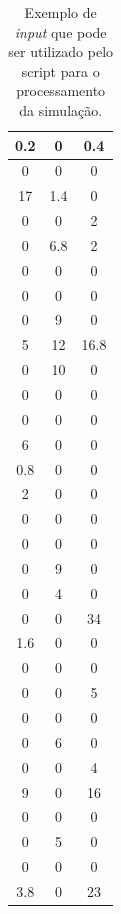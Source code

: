 \begin{table}[H]
\caption{Exemplo de \emph{input} que pode ser utilizado pelo script para o processamento da simulação.}
\label{q.input}
\centering

\begin{tabular}{|c|c|c|}
\hline
0.2 & 0   & 0.4  \\ \hline
0   & 0   & 0    \\ \hline
17  & 1.4 & 0    \\ \hline
0   & 0   & 2    \\ \hline
0   & 6.8 & 2    \\ \hline
0   & 0   & 0    \\ \hline
0   & 0   & 0    \\ \hline
0   & 9   & 0    \\ \hline
5   & 12  & 16.8 \\ \hline
0   & 10  & 0    \\ \hline
0   & 0   & 0    \\ \hline
0   & 0   & 0    \\ \hline
6   & 0   & 0    \\ \hline
0.8 & 0   & 0    \\ \hline
2   & 0   & 0    \\ \hline
0   & 0   & 0    \\ \hline
0   & 0   & 0    \\ \hline
0   & 9   & 0    \\ \hline
0   & 4   & 0    \\ \hline
0   & 0   & 34   \\ \hline
1.6 & 0   & 0    \\ \hline
0   & 0   & 0    \\ \hline
0   & 0   & 5    \\ \hline
0   & 0   & 0    \\ \hline
0   & 6   & 0    \\ \hline
0   & 0   & 4    \\ \hline
9   & 0   & 16   \\ \hline
0   & 0   & 0    \\ \hline
0   & 5   & 0    \\ \hline
0   & 0   & 0    \\ \hline
3.8 & 0   & 23   \\ \hline
\end{tabular}
\vspace*{15px}
\end{table}

